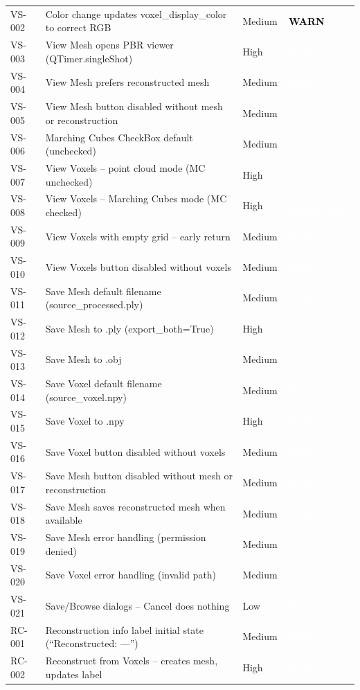 \documentclass[12pt,a4paper]{article}
\newcommand{\statuspass}{\colorbox{statusgreen}{\textcolor{white}{\textbf{\,PASS\,}}}}
\newcommand{\statuswarn}{\colorbox{statusyellow}{\textcolor{black}{\textbf{\,WARN\,}}}}
\newcommand{\statusresolved}{\colorbox{statusorange}{\textcolor{white}{\textbf{\,RESOLVED\,}}}}
\begin{document}
{\begin{longtable}{p{1.7cm}p{7.7cm}p{1.3cm}p{2cm}}
VS-002 & Color change updates voxel\_display\_color to correct RGB & Medium & \statuswarn \\
VS-003 & View Mesh opens PBR viewer (QTimer.singleShot) & High & \statuspass \\
VS-004 & View Mesh prefers reconstructed mesh & Medium & \statuspass \\
VS-005 & View Mesh button disabled without mesh or reconstruction & Medium & \statuspass \\
VS-006 & Marching Cubes CheckBox default (unchecked) & Medium & \statuspass \\
VS-007 & View Voxels -- point cloud mode (MC unchecked) & High & \statuspass \\
VS-008 & View Voxels -- Marching Cubes mode (MC checked) & High & \statusresolved \\
VS-009 & View Voxels with empty grid -- early return & Medium & \statuspass \\
VS-010 & View Voxels button disabled without voxels & Medium & \statuspass \\
VS-011 & Save Mesh default filename (source\_processed.ply) & Medium & \statuspass \\
VS-012 & Save Mesh to .ply (export\_both=True) & High & \statuspass \\
VS-013 & Save Mesh to .obj & Medium & \statuspass \\
VS-014 & Save Voxel default filename (source\_voxel.npy) & Medium & \statuspass \\
VS-015 & Save Voxel to .npy & High & \statuspass \\
VS-016 & Save Voxel button disabled without voxels & Medium & \statuspass \\
VS-017 & Save Mesh button disabled without mesh or reconstruction & Medium & \statuspass \\
VS-018 & Save Mesh saves reconstructed mesh when available & Medium & \statuspass \\
VS-019 & Save Mesh error handling (permission denied) & Medium & \statuspass \\
VS-020 & Save Voxel error handling (invalid path) & Medium & \statuspass \\
VS-021 & Save/Browse dialogs -- Cancel does nothing & Low & \statuspass \\
RC-001 & Reconstruction info label initial state (``Reconstructed: ---'') & Medium & \statuspass \\
RC-002 & Reconstruct from Voxels -- creates mesh, updates label & High & \statuspass \\

\end{longtable}}
\end{document}
